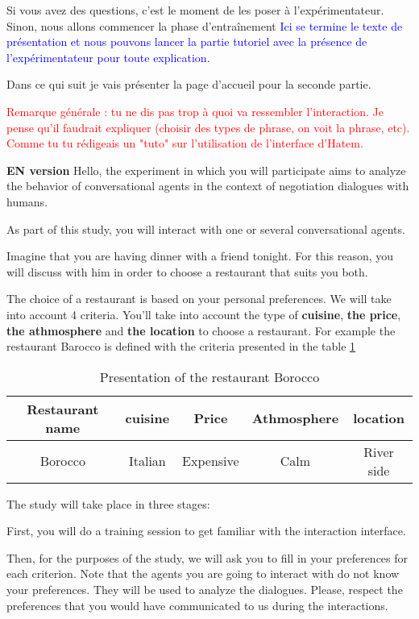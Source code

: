 \documentclass [french]{paper}
\begin{document}
		
		 Si vous avez des questions, c'est le moment de les poser à l'expérimentateur. Sinon, nous allons commencer la phase d'entraînement 
		\textcolor{blue}{Ici se termine le texte de présentation et nous pouvons lancer la partie tutoriel avec la présence de l'expérimentateur pour toute explication}.
		
		Dans ce qui suit je vais présenter la page d'accueil pour la seconde partie.
		
		\textcolor{red}{Remarque générale : tu ne dis pas trop à quoi va ressembler l'interaction. Je pense qu'il faudrait expliquer (choisir des types de phrase, on voit la phrase, etc). Comme tu tu rédigeais un "tuto" sur l'utilisation de l'interface d'Hatem. }
		
		\textbf{EN version}
			Hello, the experiment in which you will participate aims to analyze the behavior of conversational agents in the context of negotiation dialogues with  humans.
			
			As part of this study, you will interact with one or several conversational agents.
			
			Imagine that you are having dinner with a friend tonight. For this reason, you will discuss with him in order to choose a restaurant that suits you both.
			
			The choice of a restaurant is based on your personal preferences. We will take into account 4 criteria. You'll take into account the type of \textbf {cuisine}, \textbf {the price}, \textbf {the athmosphere} and \textbf {the location} to choose a restaurant. For example the restaurant Barocco is defined with the criteria presented in the table \ref{teb:exEn}
			
				\begin{table}[h]
			\begin{tabular} {|c|c|c|c|c|}
				\hline
				Restaurant name & cuisine & Price & Athmosphere & location \\
				\hline
				Borocco & Italian & Expensive & Calm & River side \\
				\hline 
			\end{tabular}
			\label{teb:exEn}
			\caption{Presentation of the restaurant Borocco}
		\end{table}
		
		The study will take place in three stages:
		
		First, you will do a training session to get familiar with the interaction interface.
		
		Then, for the purposes of the study, we will ask you to fill in your preferences for each criterion.  Note that the agents you are going to interact with do not know your preferences. They will be used to analyze the dialogues. Please, respect the preferences that you would have communicated to us during the interactions.
	
\end{document}
